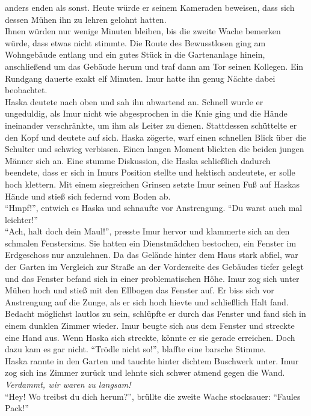 anders enden als sonst. Heute würde er seinem Kameraden beweisen, dass sich dessen Mühen ihn zu 
lehren gelohnt hatten. \\ 
Ihnen würden nur wenige Minuten bleiben, bis die zweite Wache bemerken würde, dass etwas nicht 
stimmte. Die Route des Bewusstlosen ging am Wohngebäude entlang und ein gutes Stück in die 
Gartenanlage hinein, anschließend um das Gebäude herum und traf dann am Tor seinen Kollegen. Ein 
Rundgang dauerte exakt elf Minuten. Imur hatte ihn genug Nächte dabei beobachtet. \\
Haska deutete nach oben und sah ihn abwartend an. Schnell wurde er ungeduldig, als Imur nicht 
wie abgesprochen in die Knie ging und die Hände ineinander verschränkte, um ihm als Leiter zu 
dienen. Stattdessen schüttelte er den Kopf und deutete auf sich. Haska zögerte, warf einen 
schnellen Blick über die Schulter und schwieg verbissen. Einen langen Moment blickten die 
beiden jungen Männer sich an. Eine stumme Diskussion, die Haska schließlich dadurch beendete, 
dass er sich in Imurs Position stellte und hektisch andeutete, er solle hoch klettern. Mit 
einem siegreichen Grinsen setzte Imur seinen Fuß auf Haskas Hände und stieß sich federnd vom 
Boden ab. \\
``Hmpf!'', entwich es Haska und schnaufte vor Anstrengung. ``Du warst auch mal leichter!''\\
``Ach, halt doch dein Maul!'', presste Imur hervor und klammerte sich an den schmalen Fenstersims. 
Sie hatten ein Dienstmädchen bestochen, ein Fenster im Erdgeschoss nur anzulehnen. Da das Gelände 
hinter dem Haus stark abfiel, war der Garten im Vergleich zur Straße an der Vorderseite des 
Gebäudes tiefer gelegt und das Fenster befand sich in einer problematischen Höhe. Imur zog sich 
unter Mühen hoch und stieß mit den Ellbogen das Fenster auf. Er biss sich vor Anstrengung auf die 
Zunge, als er sich hoch hievte und schließlich Halt fand. Bedacht möglichst lautlos zu sein, 
schlüpfte er durch das Fenster und fand sich in einem dunklen Zimmer wieder. Imur beugte sich aus 
dem Fenster und streckte eine Hand aus. Wenn Haska sich streckte, könnte er sie gerade erreichen. 
Doch dazu kam es gar nicht.
``Trödle nicht so!'', blaffte eine barsche Stimme.\\
Haska rannte in den Garten und tauchte hinter dichtem Buschwerk unter. Imur zog sich ins Zimmer 
zurück und lehnte sich schwer atmend gegen die Wand. \textit{Verdammt, wir waren zu langsam!}\\
``Hey! Wo treibst du dich herum?'', brüllte die zweite Wache stocksauer: ``Faules Pack!''\\
